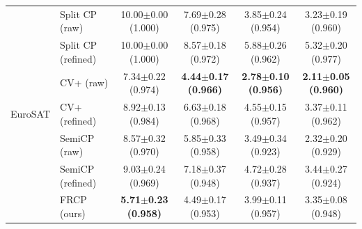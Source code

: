 \begin{table}[t]
\begin{tabular}{llcccc}
\midrule
\multirow{7}{*}{EuroSAT} & Split CP (raw) & 10.00$\pm$0.00 {\scriptsize(1.000)} & 7.69$\pm$0.28 {\scriptsize(0.975)} & 3.85$\pm$0.24 {\scriptsize(0.954)} & 3.23$\pm$0.19 {\scriptsize(0.960)}\\
 & Split CP (refined) & 10.00$\pm$0.00 {\scriptsize(1.000)} & 8.57$\pm$0.18 {\scriptsize(0.972)} & 5.88$\pm$0.26 {\scriptsize(0.962)} & 5.32$\pm$0.20 {\scriptsize(0.977)}\\
 & CV+ (raw) & 7.34$\pm$0.22 {\scriptsize(0.974)} & \textbf{4.44$\pm$0.17 {\scriptsize(0.966)}} & \textbf{2.78$\pm$0.10 {\scriptsize(0.956)}} & \textbf{2.11$\pm$0.05 {\scriptsize(0.960)}}\\
 & CV+ (refined) & 8.92$\pm$0.13 {\scriptsize(0.984)} & 6.63$\pm$0.18 {\scriptsize(0.968)} & 4.55$\pm$0.15 {\scriptsize(0.957)} & 3.37$\pm$0.11 {\scriptsize(0.962)}\\
 & SemiCP (raw) & 8.57$\pm$0.32 {\scriptsize(0.970)} & 5.85$\pm$0.33 {\scriptsize(0.958)} & 3.49$\pm$0.34 {\scriptsize(0.923)} & 2.32$\pm$0.20 {\scriptsize(0.929)}\\
 & SemiCP (refined) & 9.03$\pm$0.24 {\scriptsize(0.969)} & 7.18$\pm$0.37 {\scriptsize(0.948)} & 4.72$\pm$0.28 {\scriptsize(0.937)} & 3.44$\pm$0.27 {\scriptsize(0.924)}\\
 & FRCP (ours) & \textbf{5.71$\pm$0.23 {\scriptsize(0.958)}} & 4.49$\pm$0.17 {\scriptsize(0.953)} & 3.99$\pm$0.11 {\scriptsize(0.957)} & 3.35$\pm$0.08 {\scriptsize(0.948)}\\
\bottomrule
\end{tabular}
\end{table}

